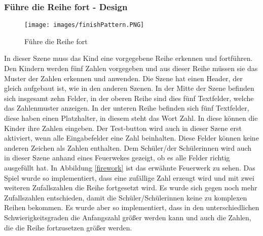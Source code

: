 \subsubsection{Führe die Reihe fort - Design}
\begin{figure}[htbp]
  \centering
  \texttt{[image: images/finishPattern.PNG]}
  \caption{Führe die Reihe fort}
  \label{finishPattern}
\end{figure}
In dieser Szene muss das Kind eine vorgegebene Reihe erkennen und fortführen. Den Kindern werden fünf Zahlen vorgegeben und aus dieser Reihe müssen sie das Muster der Zahlen erkennen und anwenden. Die Szene hat einen Header, der gleich aufgebaut ist, wie in den anderen Szenen. In der Mitte der Szene befinden sich insgesamt zehn Felder, in der oberen Reihe sind dies fünf Textfelder, welche das Zahlenmuster anzeigen. In der unteren Reihe befinden sich fünf Textfelder, diese haben einen Platzhalter, in diesem steht das Wort Zahl. In diese können die Kinder ihre Zahlen eingeben. Der Test-button wird auch in dieser Szene erst aktiviert, wenn alle Eingabefelder eine Zahl beinhalten. Diese Felder können keine anderen Zeichen als Zahlen enthalten. Dem Schüler/der Schülerinnen wird auch in dieser Szene anhand eines Feuerwekes gezeigt, ob es alle Felder richtig ausgefüllt hat. In Abbildung \ref{firework} ist das erwähnte Feuerwerk zu sehen. Das Spiel wurde so implementiert, dass eine zufällige Zahl erzeugt wird und mit zwei weiteren Zufallszahlen die Reihe fortgesetzt wird. Es wurde sich gegen noch mehr Zufallszahlen entschieden, damit die Schüler/Schülerinnen keine zu komplexen Reihen bekommen. Es wurde aber so implementiert, dass in den unterschiedlichen Schwierigkeitsgraden die Anfangszahl größer werden kann und auch die Zahlen, die die Reihe fortzusetzen größer werden.
